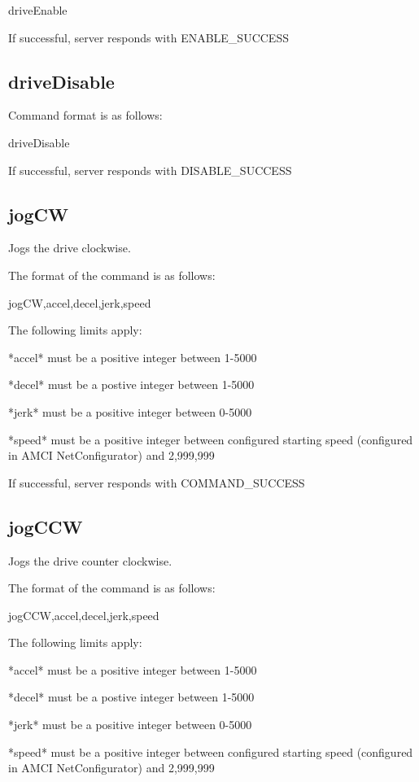 {\ttfamily drive\+Enable}

If successful, server responds with {\ttfamily E\+N\+A\+B\+L\+E\+\_\+\+S\+U\+C\+C\+E\+S\+S}\hypertarget{index_driveDisable}{}\subsection{drive\+Disable}\label{index_driveDisable}
Command format is as follows\+:

{\ttfamily drive\+Disable}

If successful, server responds with {\ttfamily D\+I\+S\+A\+B\+L\+E\+\_\+\+S\+U\+C\+C\+E\+S\+S}\hypertarget{index_jogCW}{}\subsection{jog\+C\+W}\label{index_jogCW}
Jogs the drive clockwise.

The format of the command is as follows\+:

{\ttfamily jog\+C\+W,accel,decel,jerk,speed}

The following limits apply\+: \begin{DoxyVerb}*accel* must be a positive integer between 1-5000

*decel* must be a postive integer between 1-5000

*jerk* must be a positive integer between 0-5000

*speed* must be a positive integer between configured starting speed (configured in AMCI NetConfigurator) and 2,999,999
\end{DoxyVerb}


If successful, server responds with {\ttfamily C\+O\+M\+M\+A\+N\+D\+\_\+\+S\+U\+C\+C\+E\+S\+S}\hypertarget{index_jogCCW}{}\subsection{jog\+C\+C\+W}\label{index_jogCCW}
Jogs the drive counter clockwise.

The format of the command is as follows\+:

{\ttfamily jog\+C\+C\+W,accel,decel,jerk,speed}

The following limits apply\+: \begin{DoxyVerb}*accel* must be a positive integer between 1-5000

*decel* must be a postive integer between 1-5000

*jerk* must be a positive integer between 0-5000

*speed* must be a positive integer between configured starting speed (configured in AMCI NetConfigurator) and 2,999,999
\end{DoxyVerb}


